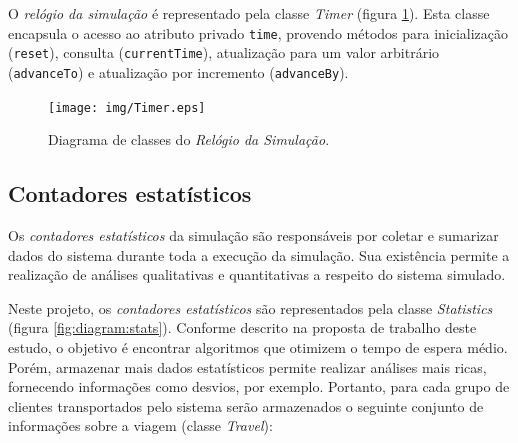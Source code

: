 O \textit{relógio da simulação} é representado pela classe \textit{Timer}
(figura \ref{fig:diagram:timer}). Esta classe encapsula o acesso ao atributo
privado \texttt{time}, provendo métodos para inicialização (\texttt{reset}),
consulta (\texttt{currentTime}), atualização para um valor arbitrário
(\texttt{advanceTo}) e atualização por incremento (\texttt{advanceBy}).

\begin{figure}[htb!]
  \centering
  \texttt{[image: img/Timer.eps]}
  \caption{Diagrama de classes do \textit{Relógio da Simulação}.}
\label{fig:diagram:timer}
\end{figure}

\subsection{Contadores estatísticos}

Os \textit{contadores estatísticos} da simulação são responsáveis por coletar e
sumarizar dados do sistema durante toda a execução da simulação. Sua existência
permite a realização de análises qualitativas e quantitativas a respeito do
sistema simulado.

Neste projeto, os \textit{contadores estatísticos} são representados pela classe
\textit{Statistics} (figura \ref{fig:diagram:stats}). Conforme descrito na
proposta de trabalho deste estudo, o objetivo é encontrar algoritmos que
otimizem o tempo de espera médio. Porém, armazenar mais dados estatísticos
permite realizar análises mais ricas, fornecendo informações como desvios, por
exemplo. Portanto, para cada grupo de clientes transportados pelo sistema serão
armazenados o seguinte conjunto de informações sobre a viagem (classe
\textit{Travel}):

